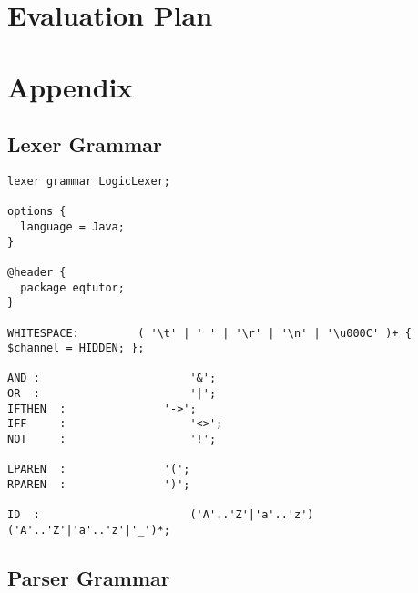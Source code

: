 \documentclass[12pt]{article}
\begin{document}
\section{Evaluation Plan}

\newpage

\section{Appendix}

\subsection{Lexer Grammar}

\begin{verbatim}
lexer grammar LogicLexer;

options {
  language = Java;
}

@header {
  package eqtutor;
}

WHITESPACE:			( '\t' | ' ' | '\r' | '\n' | '\u000C' )+ { $channel = HIDDEN; };

AND	:						'&';
OR	:						'|';
IFTHEN	:				'->';
IFF 	:					'<>';
NOT 	:					'!';

LPAREN  :				'(';
RPAREN  :				')';

ID	:						('A'..'Z'|'a'..'z') ('A'..'Z'|'a'..'z'|'_')*;
\end{verbatim}

\newpage

\subsection{Parser Grammar}
\end{document}
